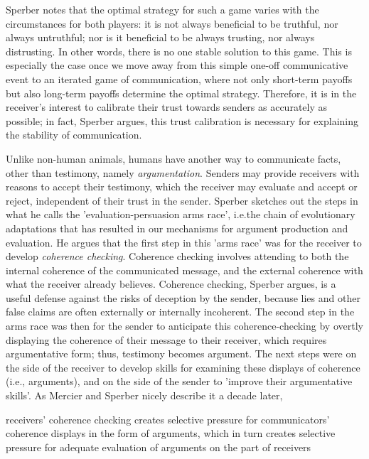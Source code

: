 Sperber notes that the optimal strategy for such a game varies with the circumstances for both players: it is not always beneficial to be truthful, nor always untruthful; nor is it beneficial to be always trusting, nor always distrusting. In other words, there is no one stable solution to this game.
This is especially the case once we move away from this simple one-off communicative event to an iterated game of communication, where not only short-term payoffs but also long-term payoffs determine the optimal strategy.
Therefore, it is in the receiver's interest to calibrate their trust towards senders as accurately as possible; in fact, Sperber argues, this trust calibration is necessary for explaining the stability of communication.

Unlike non-human animals, humans have another way to communicate facts, other than testimony, namely \emph{argumentation}. Senders may provide receivers with reasons to accept their testimony, which the receiver may evaluate and accept or reject, independent of their trust in the sender.
Sperber sketches out the steps in what he calls the 'evaluation-persuasion arms race', i.e.\@ the chain of evolutionary adaptations that has resulted in our mechanisms for argument production and evaluation.
He argues that the first step in this 'arms race' was for the receiver to develop \emph{coherence checking}. Coherence checking involves attending to both the internal coherence of the communicated message, and the external coherence with what the receiver already believes. Coherence checking, Sperber argues, is a useful defense against the risks of deception by the sender, because lies and other false claims are often externally or internally incoherent.
The second step in the arms race was then for the sender to anticipate this coherence-checking by overtly displaying the coherence of their message to their receiver, which requires argumentative form; thus, testimony becomes argument.
The next steps were on the side of the receiver to develop skills for examining these displays of coherence (i.e., arguments), and on the side of the sender to 'improve their argumentative skills'.
As Mercier and Sperber nicely describe it a decade later,
\begin{quoting}
    receivers' coherence checking creates selective pressure for communicators' coherence displays in the form of arguments, which in turn creates selective pressure for adequate evaluation of arguments on the part of receivers
    \hfill \citep[p.~96]{MS11}
\end{quoting}


